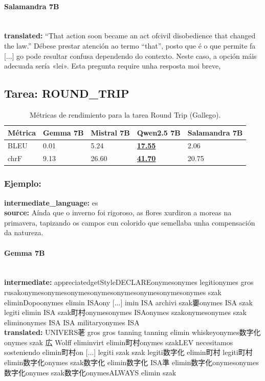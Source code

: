 \paragraph{Salamandra 7B}~\\
\textbf{translated:} “That action soon became an act ofcivil disobedience that changed the law.”  Débese prestar atención ao termo “that”, posto que é o que permite fa [...] go pode resultar confusa dependendo do contexto. Neste caso, a opción máis adecuada sería «lei».    Esta pregunta require unha resposta moi breve,

\subsection{Tarea: ROUND\_TRIP}\label{tarea-round_trip}
\begin{longtable}[]{@{}lllll@{}}
\toprule\noalign{}
Métrica & Gemma 7B & Mistral 7B & Qwen2.5 7B & Salamandra 7B \\
\midrule\noalign{}
\endhead
\bottomrule\noalign{}
\caption{Métricas de rendimiento para la tarea Round Trip (Gallego).}
\label{tab:metricas_round_trip_Gallego}
\endlastfoot
BLEU & 0.01 & 5.24 & \textbf{\underline{17.55}} & 2.06 \\
chrF & 9.13 & 26.60 & \textbf{\underline{41.70}} & 20.75 \\
\end{longtable}

\subsubsection{Ejemplo:}
\textbf{intermediate\_language:} es\\
\textbf{source:} Aínda que o inverno foi rigoroso, as flores xurdiron a moreas na primavera, tapizando os campos cun colorido que semellaba unha compensación da natureza. 

\paragraph{Gemma 7B}~\\
\textbf{intermediate:} appreciatedgetStyleDECLAREonymesonymes legitionymes gros rusakonymesonymesonymesonymesonymesonymesonymesonymes szak eliminDopoonymes elimin ISAony [...] imin ISA archivi szak嫑onymes ISA szak legiti elimin ISA szak町村onymesonymes ISAonymes szakonymesonymes szak eliminonymes ISA ISA militaryonymes ISA\\
\textbf{translated:} UNIVERS荖 gros gros tanning tanning elimin whiskeyonymes数字化onymes szak 広 Wolff eliminvirt elimin町村onymes szakLEV necesitamos sosteniendo elimin町村on [...] legiti szak szak legiti数字化 elimin町村 legiti町村 elimin数字化onymes szak数字化 elimin数字化 ISA準 elimin数字化onymesonymes数字化onymes szak数字化onymesALWAYS elimin szak

